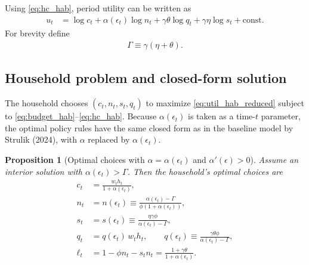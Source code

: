 \documentclass[11pt]{article}
\newtheorem{proposition}{Proposition}
\begin{document}
Using \eqref{eq:hc_hab}, period utility can be written as
\begin{align}
u_t
&=\log c_t + \alpha(\epsilon_t)\log n_t + \gamma\theta \log q_t + \gamma\eta \log s_t + \text{const}.
\label{eq:util_hab_reduced}
\end{align}
For brevity define
\begin{align}
\Gamma \equiv \gamma(\eta+\theta). \label{eq:Gamma_def_hab}
\end{align}

\subsection{Household problem and closed-form solution}
The household chooses $(c_t,n_t,s_t,q_t)$ to maximize \eqref{eq:util_hab_reduced} subject to
\eqref{eq:budget_hab}--\eqref{eq:hc_hab}. Because $\alpha(\epsilon_t)$ is taken as a time-$t$ parameter, the optimal policy rules
have the same closed form as in the baseline model by Strulik (2024), with $\alpha$ replaced by $\alpha(\epsilon_t)$.

\begin{proposition}[Optimal choices with $\alpha=\alpha(\epsilon_t)$ and $\alpha'(\epsilon)>0$]
\label{prop:hab_solution}
Assume an interior solution with $\alpha(\epsilon_t)>\Gamma$. Then the household's optimal choices are
\begin{align}
c_t
&=\frac{w_t h_t}{1+\alpha(\epsilon_t)},
\label{eq:sol_c_hab}\\[4pt]
n_t
&= n(\epsilon_t)
\equiv
\frac{\alpha(\epsilon_t)-\Gamma}{\phi\left(1+\alpha(\epsilon_t)\right)},
\label{eq:sol_n_hab}\\[4pt]
s_t
&= s(\epsilon_t)
\equiv
\frac{\eta\gamma\phi}{\alpha(\epsilon_t)-\Gamma},
\label{eq:sol_s_hab}\\[4pt]
q_t
&= q(\epsilon_t)\, w_t h_t,
\qquad
q(\epsilon_t)\equiv
\frac{\gamma\theta\phi}{\alpha(\epsilon_t)-\Gamma},
\label{eq:sol_q_hab}\\[4pt]
\ell_t
&=1-\phi n_t - s_t n_t
=\frac{1+\gamma\theta}{1+\alpha(\epsilon_t)}.
\label{eq:sol_l_hab}
\end{align}
\end{proposition}
\end{document}
